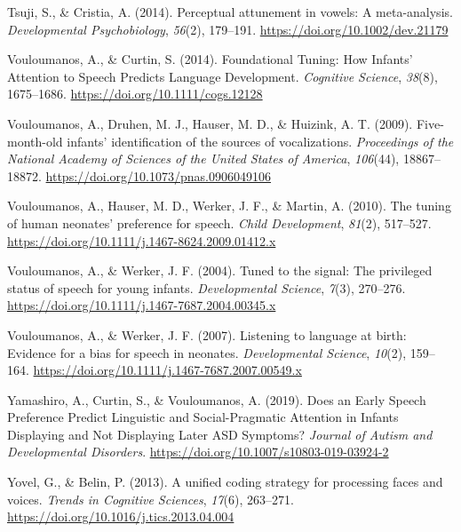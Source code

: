 \documentclass[man]{apa6}
\begin{document}
\leavevmode\hypertarget{ref-tsuji_perceptual_2014}{}%
Tsuji, S., \& Cristia, A. (2014). Perceptual attunement in vowels: A meta-analysis. \emph{Developmental Psychobiology}, \emph{56}(2), 179--191. \url{https://doi.org/10.1002/dev.21179}

\leavevmode\hypertarget{ref-vouloumanos_foundational_2014}{}%
Vouloumanos, A., \& Curtin, S. (2014). Foundational Tuning: How Infants' Attention to Speech Predicts Language Development. \emph{Cognitive Science}, \emph{38}(8), 1675--1686. \url{https://doi.org/10.1111/cogs.12128}

\leavevmode\hypertarget{ref-vouloumanos_five-month-old_2009}{}%
Vouloumanos, A., Druhen, M. J., Hauser, M. D., \& Huizink, A. T. (2009). Five-month-old infants' identification of the sources of vocalizations. \emph{Proceedings of the National Academy of Sciences of the United States of America}, \emph{106}(44), 18867--18872. \url{https://doi.org/10.1073/pnas.0906049106}

\leavevmode\hypertarget{ref-vouloumanos_tuning_2010}{}%
Vouloumanos, A., Hauser, M. D., Werker, J. F., \& Martin, A. (2010). The tuning of human neonates' preference for speech. \emph{Child Development}, \emph{81}(2), 517--527. \url{https://doi.org/10.1111/j.1467-8624.2009.01412.x}

\leavevmode\hypertarget{ref-vouloumanos_tuned_2004}{}%
Vouloumanos, A., \& Werker, J. F. (2004). Tuned to the signal: The privileged status of speech for young infants. \emph{Developmental Science}, \emph{7}(3), 270--276. \url{https://doi.org/10.1111/j.1467-7687.2004.00345.x}

\leavevmode\hypertarget{ref-vouloumanos_listening_2007}{}%
Vouloumanos, A., \& Werker, J. F. (2007). Listening to language at birth: Evidence for a bias for speech in neonates. \emph{Developmental Science}, \emph{10}(2), 159--164. \url{https://doi.org/10.1111/j.1467-7687.2007.00549.x}

\leavevmode\hypertarget{ref-yamashiro_does_2019}{}%
Yamashiro, A., Curtin, S., \& Vouloumanos, A. (2019). Does an Early Speech Preference Predict Linguistic and Social-Pragmatic Attention in Infants Displaying and Not Displaying Later ASD Symptoms? \emph{Journal of Autism and Developmental Disorders}. \url{https://doi.org/10.1007/s10803-019-03924-2}

\leavevmode\hypertarget{ref-yovel_unified_2013}{}%
Yovel, G., \& Belin, P. (2013). A unified coding strategy for processing faces and voices. \emph{Trends in Cognitive Sciences}, \emph{17}(6), 263--271. \url{https://doi.org/10.1016/j.tics.2013.04.004}

\endgroup
\end{document}
